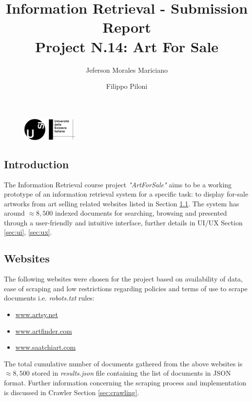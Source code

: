 \documentclass[12pt]{spieman}  %
\title{Information Retrieval - Submission Report \\Project N.14: Art For Sale}
\author{Jeferson Morales Mariciano}
\author{Filippo Piloni}
\affil{Università della Svizzera italiana, Faculty of Informatics, Lugano, Switzerland}
\begin{document}
\begin{figure}
    \includegraphics[width=0.25\textwidth, trim={0cm 0cm 0cm 7cm}]{USI_logo.png}
\end{figure}

\maketitle
\tableofcontents
\newpage

\begin{spacing}{1}   %

    \section{Introduction}
    The Information Retrieval course project \textit{"ArtForSale"} aims to be a working prototype of an information
    retrieval system for a specific task: to display for-sale artworks from art selling related websites
    listed in Section \ref{sec:websites}.
    The system has around $\approx 8,500$ indexed documents for searching, browsing and presented through a
    user-friendly and intuitive interface, further details in UI/UX Section \ref{sec:ui}, \ref{sec:ux}.

    \subsection{Websites}\label{sec:websites}
    The following websites were chosen for the project based on availability of data, ease of scraping and
    low restrictions regarding policies and terms of use to scrape documents i.e. \textit{robots.txt} rules:

    \begin{itemize}
        \item \url{www.artsy.net}
        \item \url{www.artfinder.com}
        \item \url{www.saatchiart.com}
    \end{itemize}

    The total cumulative number of documents gathered from the above websites is $\approx 8,500$ stored in
    \textit{results.json} file containing the list of documents in JSON format.
    Further information concerning the scraping process and implementation is discussed
    in Crawler Section \ref{sec:crawling}.


\end{spacing}
\end{document}

